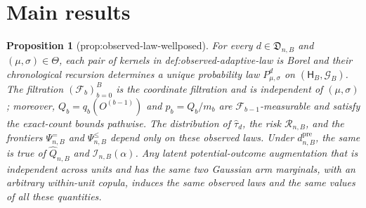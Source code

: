 \documentclass{article}
\newtheorem{proposition}{Proposition}
\begin{document}
\section{Main results}

\begin{proposition}[prop:observed-law-wellposed]\label{prop:observed-law-wellposed}
For every \(d\in\mathfrak D_{n,B}\) and \((\mu,\sigma)\in\Theta\), each pair of kernels in def:observed-adaptive-law is Borel and their chronological recursion determines a unique probability law \(P^{d}_{\mu,\sigma}\) on \((\mathsf H_B,\mathcal G_B)\). The filtration \((\mathcal F_b)_{b=0}^B\) is the coordinate filtration and is independent of \((\mu,\sigma)\); moreover, \(Q_b=q_b(O^{(b-1)})\) and \(p_b=Q_b/m_b\) are \(\mathcal F_{b-1}\)-measurable and satisfy the exact-count bounds pathwise. The distribution of \(\widehat\tau_d\), the risk \(\mathcal R_{n,B}\), and the frontiers \(\Psi^{=}_{n,B}\) and \(\Psi^{\le}_{n,B}\) depend only on these observed laws. Under \(d^{\mathrm{pre}}_{n,B}\), the same is true of \(\widehat Q_{n,B}\) and \(\mathcal I_{n,B}(\alpha)\). Any latent potential-outcome augmentation that is independent across units and has the same two Gaussian arm marginals, with an arbitrary within-unit copula, induces the same observed laws and the same values of all these quantities.
\end{proposition}
\end{document}
